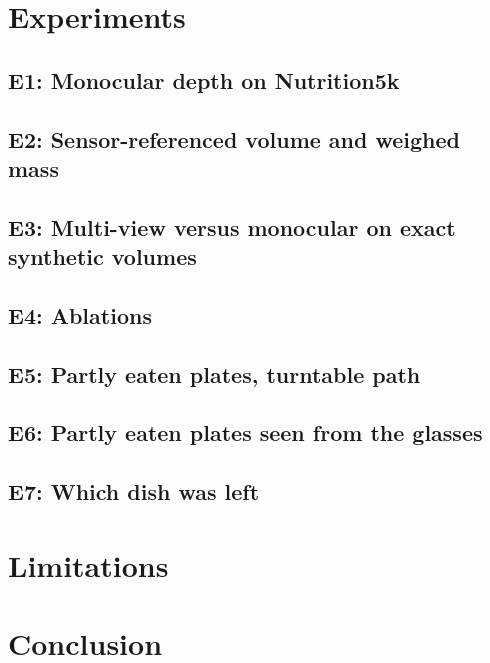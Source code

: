\documentclass[conference]{IEEEtran}
\begin{document}
\section{Experiments}
\subsection{E1: Monocular depth on Nutrition5k}


\subsection{E2: Sensor-referenced volume and weighed mass}


\subsection{E3: Multi-view versus monocular on exact synthetic volumes}\label{sec:synth}


\subsection{E4: Ablations}


\subsection{E5: Partly eaten plates, turntable path}\label{sec:e5}


\subsection{E6: Partly eaten plates seen from the glasses}\label{sec:e6}


\subsection{E7: Which dish was left}\label{sec:e7}


\section{Limitations}


\section{Conclusion}

\end{document}
